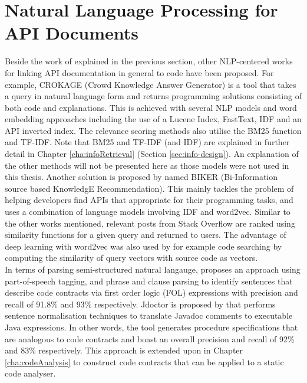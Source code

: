 \section{Natural Language Processing for API Documents}
\label{sec:related-nlp}
Beside the work of \cite{jiamou} explained in the previous section, other NLP-centered works for linking API documentation in general to code have been proposed. For example, CROKAGE (Crowd Knowledge Answer Generator) is a tool that takes a query in natural language form and returns programming solutions consisting of both code and explanations. This is achieved with several NLP models and word embedding approaches including the use of a Lucene Index, FastText, IDF and an API inverted index. The relevance scoring methods also utilise the BM25 function and TF-IDF. Note that BM25 and TF-IDF (and IDF) are explained in further detail in Chapter \ref{cha:infoRetrieval} (Section \ref{sec:info-design}). An explanation of the other methods will not be presented here as those models were not used in this thesis. Another solution is proposed by \cite{huang2018api} named BIKER (Bi-Information source based KnowledgE Recommendation). This mainly tackles the problem of helping developers find APIs that appropriate for their programming tasks, and uses a combination of language models involving IDF and word2vec. Similar to the other works mentioned, relevant posts from Stack Overflow are ranked using similarity functions for a given query and returned to users. The advantage of deep learning with word2vec was also used by \cite{van2017combining} for example code searching by computing the similarity of query vectors with source code as vectors. \\
In terms of parsing semi-structured natural langauge, \cite{pandita2012inferring} proposes an approach using part-of-speech tagging, and phrase and clause parsing to identify sentences that describe code contracts via first order logic (FOL) expressions with precision and recall of 91.8\% and 93\% respectively. Jdoctor is proposed by \cite{blasi2018translating} that performs sentence normalisation techniques to translate Javadoc comments to executable Java expressions. In other words, the tool generates procedure specifications that are analogous to code contracts and boast an overall precision and recall of 92\% and 83\% respectively. This approach is extended upon in Chapter \ref{cha:codeAnalysis} to construct code contracts that can be applied to a static code analyser. 

